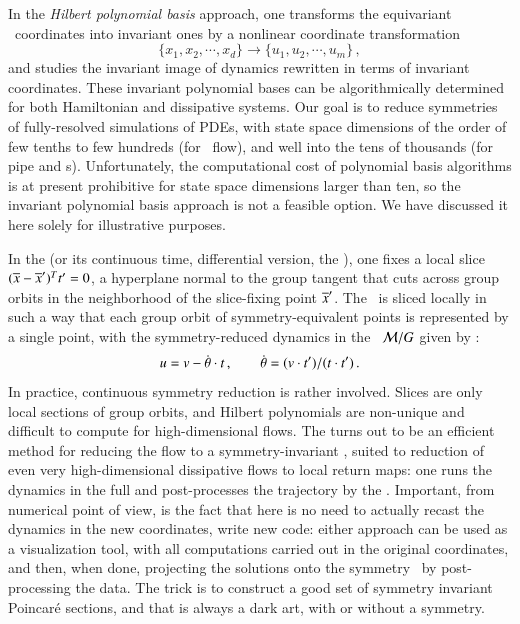 \documentclass[preprint,number,sort&compress]{elsarticle}
\begin{document}
In the {\em Hilbert polynomial basis} approach, one transforms
the equivariant \statesp\ coordinates into invariant ones by
a nonlinear coordinate transformation
\[
\{x_1,x_2,\cdots,x_d\} \to \{u_1,u_2,\cdots,u_m\}
\,,
\]
and studies the invariant image of dynamics rewritten in
terms of invariant coordinates. These invariant polynomial
bases can be algorithmically determined for both Hamiltonian
and dissipative systems. Our goal is to reduce symmetries of
fully-resolved simulations of PDEs, with state space
dimensions of the order of few tenths to few hundreds (for
\KS\ flow), and well into the tens  of thousands (for pipe
and \pCf s). Unfortunately, the computational cost of
polynomial basis algorithms is at present prohibitive for
state space dimensions larger than ten, so the invariant
polynomial basis approach is not a feasible option. We have
discussed it here solely for illustrative purposes.

In the \emph{\mframes} (or its continuous time, differential
version, the \emph{\mslices}), one fixes a local slice
$(\overline{x} - {\overline{x}'} )^T t' =0$, a hyperplane normal
to the group tangent \sliceTan{} that cuts across group
orbits in the neighborhood of the slice-fixing point
${\overline{x}'}$. The \statesp\ is sliced locally in such a way
that each group orbit of symmetry-equivalent points is
represented by a single point, with the symmetry-reduced
dynamics in the \reducedsp\ ${\cal M}/G$ given by
:
\[
u = v - \dot{{\bf \theta}}  \cdot t
    \,,\qquad
\dot{{\bf \theta}} = (v \cdot t')/(t \cdot t')
\,.
\]
In practice, continuous symmetry reduction is rather
involved. Slices are only local sections of group orbits, and
Hilbert polynomials are non-unique and difficult to compute
for high-dimensional flows.
The {\mframes}
turns out to be an efficient method for reducing the
flow to a symmetry-invariant \reducedsp, suited to reduction
of {even very high-dimensional}
dissipative flows to local return maps:
one runs the dynamics in the full \statesp and
post-processes the trajectory by the \mframes. 
Important, from numerical point of  view, is the
fact that here is no need to
actually recast the dynamics in the new coordinates,
write new code: either
approach can be used as a visualization tool, with all
computations carried out in the original coordinates, and
then, when done, projecting the solutions onto the symmetry
\reducedsp\ by post-processing the data. The trick is to
construct a good set of symmetry invariant Poincar\'e
sections, and that is always a dark art, with or without a
symmetry.
\end{document}
